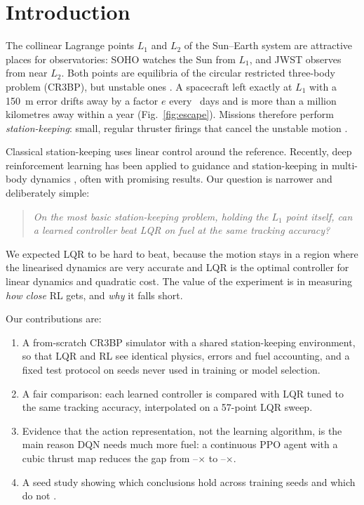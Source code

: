 \documentclass[11pt,a4paper]{article}
\begin{document}
\section{Introduction}

The collinear Lagrange points $L_1$ and $L_2$ of the Sun--Earth system are
attractive places for observatories: SOHO watches the Sun from $L_1$, and JWST
observes from near $L_2$. Both points are equilibria of the circular restricted
three-body problem (CR3BP), but unstable ones \cite{szebehely1967,koon2011}. A
spacecraft left exactly at $L_1$ with a 150~m error drifts away by a factor $e$
every \efoldDays~days and is more than a million kilometres away within a year
(Fig.~\ref{fig:escape}). Missions therefore perform \emph{station-keeping}: small,
regular thruster firings that cancel the unstable motion
\cite{farquhar1970,howell1993}.

Classical station-keeping uses linear control around the reference. Recently,
deep reinforcement learning has been applied to guidance and station-keeping in
multi-body dynamics \cite{lafarge2021,lafarge2022,molnar2020,suda2023}, often
with promising results. Our question is narrower and deliberately simple:
\begin{quote}
\emph{On the most basic station-keeping problem, holding the $L_1$ point
itself, can a learned controller beat LQR on fuel at the same tracking
accuracy?}
\end{quote}
We expected LQR to be hard to beat, because the motion stays in a region where
the linearised dynamics are very accurate and LQR is the optimal controller for
linear dynamics and quadratic cost. The value of the experiment is in measuring
\emph{how close} RL gets, and \emph{why} it falls short.

Our contributions are:
\begin{enumerate}
\item A from-scratch CR3BP simulator with a shared station-keeping environment,
      so that LQR and RL see identical physics, errors and fuel accounting, and
      a fixed test protocol on seeds never used in training or model selection.
\item A fair comparison: each learned controller is compared with LQR tuned to
      the same tracking accuracy, interpolated on a 57-point LQR sweep.
\item Evidence that the action representation, not the learning algorithm, is
      the main reason DQN needs much more fuel: a continuous PPO agent with a
      cubic thrust map reduces the gap from \dqnRatioMin--\dqnRatioMax$\times$
      to \cubRatioMin--\cubRatioMax$\times$.
\item A seed study showing which conclusions hold across training seeds and
      which do not \cite{henderson2018,agarwal2021}.
\end{enumerate}
\end{document}
